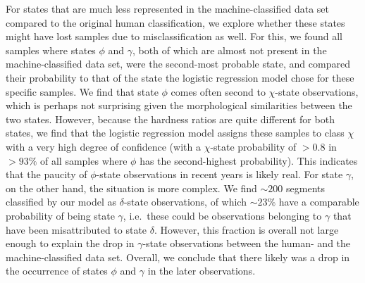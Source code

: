 \documentclass[12pt]{emulateapj}
\begin{document}
For states that are much less represented in the machine-classified data set compared to the original human classification, we explore whether these states might have lost samples due to misclassification as well. For this, we found all samples where states $\phi$ and $\gamma$, both of which are almost not present in the 
machine-classified data set, were the second-most probable state, and compared their probability to that of the state the logistic regression model chose for these specific samples. We find that state $\phi$ comes often second to $\chi$-state observations, which is perhaps not surprising given the morphological similarities between the two states. However, because the hardness ratios are quite different for both states, we find that the logistic regression model assigns these samples to class $\chi$ with a very high degree of confidence (with a $\chi$-state probability of $>0.8$ in $>93\%$ of all samples where $\phi$ has the second-highest probability). This indicates that the paucity of $\phi$-state observations in recent years is likely real. 
For state $\gamma$, on the other hand, the situation is more complex. We find $\sim 200$ segments classified by our model as $\delta$-state observations, of which $\sim 23\%$ have a comparable probability of being state $\gamma$, i.e.\ these could be observations belonging to $\gamma$ that have been misattributed to state $\delta$. However, this fraction is overall not large enough to explain the drop in $\gamma$-state observations between the human- and the machine-classified data set.
Overall, we conclude that there likely was a drop in the occurrence of states $\phi$ and $\gamma$ in the  later observations.
\end{document}
